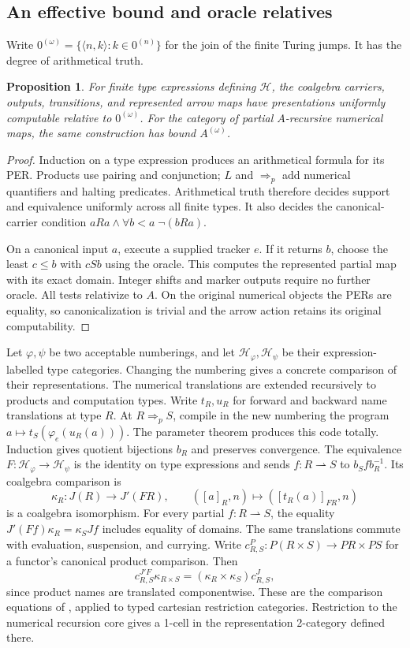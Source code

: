 \documentclass[11pt]{article}
\newtheorem{proposition}[theorem]{Proposition}
\theoremstyle{definition}
\newcommand{\Hcat}{\mathcal H}
\newcommand{\pArr}{\mathbin{\Rightarrow_{\!p}}}
\begin{document}
\subsection{An effective bound and oracle relatives}

Write $0^{(\omega)}=\{\langle n,k\rangle:k\in0^{(n)}\}$
for the join of the finite Turing jumps. It has the degree of
arithmetical truth.

\begin{proposition}\label{prop:effective}
For finite type expressions defining $\Hcat$, the coalgebra carriers,
outputs, transitions, and represented arrow maps have presentations
uniformly computable relative to $0^{(\omega)}$. For the category
of partial $A$-recursive numerical maps, the same construction has
bound $A^{(\omega)}$.
\end{proposition}
\begin{proof}
Induction on a type expression produces an arithmetical formula for
its PER. Products use pairing and conjunction; $L$ and $\pArr$
add numerical quantifiers and halting predicates. Arithmetical truth
therefore decides support and equivalence uniformly across all finite
types. It also decides the canonical-carrier condition
$aRa\land\forall b<a\;\neg(bRa)$.

On a canonical input $a$, execute a supplied tracker $e$. If it
returns $b$, choose the least $c\leq b$ with $cSb$ using the
oracle. This computes the represented partial map with its exact
domain. Integer shifts and marker outputs require no further oracle.
All tests relativize to $A$. On the original numerical objects the
PERs are equality, so canonicalization is trivial and the arrow
action retains its original computability.
\end{proof}

Let $\varphi,\psi$ be two acceptable numberings, and let
$\Hcat_\varphi,\Hcat_\psi$ be their expression-labelled type
categories. Changing the numbering gives a concrete comparison of
their representations. The numerical translations are extended recursively
to products and computation types. Write $t_R,u_R$ for forward and
backward name translations at type $R$. At $R\pArr S$, compile
in the new numbering the program
$a\mapsto t_S(\varphi_e(u_R(a)))$. The parameter theorem produces
this code totally. Induction gives quotient bijections $b_R$
and preserves convergence. The equivalence
$F:\Hcat_\varphi\to\Hcat_\psi$ is the identity on type
expressions and sends $f:R\rightharpoonup S$ to
$b_Sfb_R^{-1}$. Its coalgebra comparison is
\[
 \kappa_R:J(R)\longrightarrow J'(FR),\qquad
 ([a]_R,n)\longmapsto([t_R(a)]_{FR},n)
\]
is a coalgebra isomorphism. For every partial $f:R\rightharpoonup S$,
the equality $J'(Ff)\kappa_R=\kappa_SJf$ includes equality of
domains. The same translations commute with evaluation, suspension,
and currying. Write $c^P_{R,S}:P(R\times S)\to PR\times PS$
for a functor's canonical product comparison. Then
\[
 c^{J'F}_{R,S}\kappa_{R\times S}
       =(\kappa_R\times\kappa_S)c^J_{R,S},
\]
since product names are translated componentwise. These are the
comparison equations of \cite[Section 3]{Catalogue}, applied to
typed cartesian restriction categories. Restriction to the numerical
recursion core gives a 1-cell in the representation 2-category
defined there.
\end{document}
